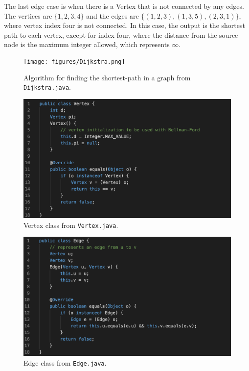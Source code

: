 \documentclass[12pt]{article}
\begin{document}
The last edge case is when there is a Vertex that is not connected by any edges. The vertices are $\{1, 2, 3, 4\}$ and the edges are $\{(1, 2, 3), (1, 3, 5), (2, 3, 1)\}$, where vertex index four is not connected. In this case, the output is the shortest path to each vertex, except for index four, where the distance from the source node is the maximum integer allowed, which represents $\infty$.

\clearpage
\begin{figure}[h]
    \centering
    \texttt{[image: figures/Dijkstra.png]}
    \caption{Algorithm for finding the shortest-path in a graph from \texttt{Dijkstra.java}.}
\end{figure}

\begin{figure}[h]
    \centering
    \includegraphics[scale=1]{figures/Vertex.png}
    \caption{Vertex class from \texttt{Vertex.java}.}
\end{figure}

\begin{figure}[h]
    \centering
    \includegraphics[scale=1]{figures/Edge.png}
    \caption{Edge class from \texttt{Edge.java}.}
\end{figure}
\end{document}
